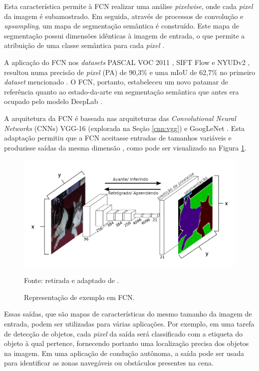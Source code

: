 Esta característica permite à FCN realizar uma análise \textit{pixelwise}, onde cada \textit{pixel} da imagem é subamostrado. Em seguida, através de processos de convolução e \textit{upsampling}, um mapa de segmentação semântica é construído. Este mapa de segmentação possui dimensões idênticas à imagem de entrada, o que permite a atribuição de uma classe semântica para cada \textit{pixel} \citep{Minaee2021, Zhang2018, Hesamian2019}.

A aplicação do FCN nos \textit{datasets} PASCAL VOC 2011 \citep{everingham2010pascal}, SIFT Flow \citep{Liu2011} e NYUDv2 \citep{Silberman:ECCV12}, resultou numa precisão de \textit{pixel} (PA) de 90,3\% e uma mIoU de 62,7\% no primeiro \textit{dataset} mencionado \citep{Ghosh2019}. O FCN, portanto, estabeleceu um novo patamar de referência quanto ao estado-da-arte em segmentação semântica \citep{Minaee2021} que antes era ocupado pelo modelo DeepLab \citep{Chen2017deeplab}.

A arquitetura da FCN é baseada nas arquiteturas das \textit{Convolutional Neural Networks} (CNNs) VGG-16 (explorada na Seção \ref{cnn:vgg}) e GoogLeNet \citep{Szegedy2015}. Esta adaptação permitiu que a FCN aceitasse entradas de tamanhos variáveis e produzisse saídas da mesma dimensão \citep{Minaee2021}, como pode ser visualizado na Figura \ref{semantic:fig:6}.

\begin{figure}[H]
    \centering
    \caption{Representação de exemplo em FCN.}
    \includegraphics[width=1\linewidth]{recursos/imagens/semantic/fcn_example.png}
    \label{semantic:fig:6}

    Fonte: retirada e adaptado de \cite{Shelhamer2016}.
\end{figure}

Essas saídas, que são mapas de características do mesmo tamanho da imagem de entrada, podem ser utilizadas para várias aplicações. Por exemplo, em uma tarefa de detecção de objetos, cada \textit{pixel} da saída será classificado com a etiqueta do objeto à qual pertence, fornecendo portanto uma localização precisa dos objetos na imagem. Em uma aplicação de condução autônoma, a saída pode ser usada para identificar as zonas navegáveis ou obstáculos presentes na cena.

